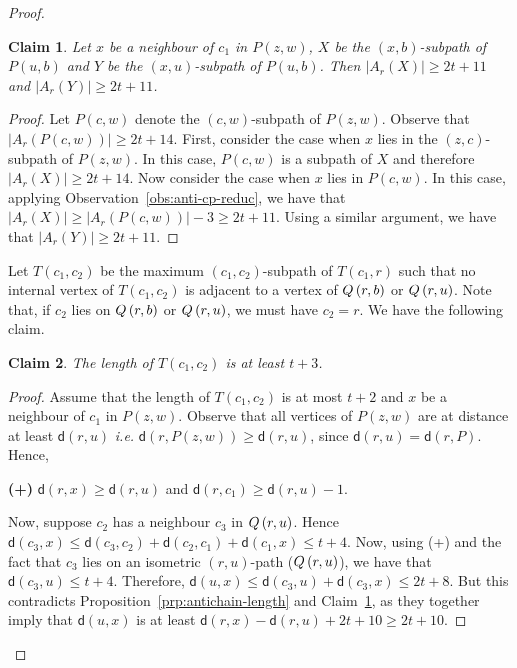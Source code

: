 \documentclass[a4paper]{article}
\newcommand{\dist}[2]{\mathsf{d}\left(#1,#2\right)}
\newcommand{\anticp}[2]{A_{#1}\left(#2\right)}
\newcommand{\Pnote}[2]{P\left(#1,#2\right)}
\newtheorem{claim}{Claim}[theorem]
\begin{document}
\begin{proof}
\begin{claim}\label{clm:life-saver}
Let $x$ be a neighbour of $c_1$ in $\Pnote{z}{w}$, $X$ be the $(x,b)$-subpath of $\Pnote{u}{b}$ and $Y$ be the $(x,u)$-subpath of $\Pnote{u}{b}$. Then $|\anticp{r}{X}| \geq 2t+11$ and $|\anticp{r}{Y}| \geq 2t+11$.
\end{claim}


 \begin{proof}
\sloppy  Let $\Pnote{c}{w}$ denote the %
 $(c,w)$-subpath of $\Pnote{z}{w}$. Observe that $|\anticp{r}{\Pnote{c}{w}}| \geq 2t+14$.
 First, consider the case when $x$ lies in the $(z,c)$-subpath of $\Pnote{z}{w}$. In this case, $\Pnote{c}{w}$ is a subpath of $X$ and therefore $|\anticp{r}{X}| \geq 2t+14$. Now consider the case when $x$ lies in $\Pnote{c}{w}$. In this case, applying Observation~\ref{obs:anti-cp-reduc}, we have that $|\anticp{r}{X}| \geq |\anticp{r}{\Pnote{c}{w}}| - 3 \geq 2t+11$. Using a similar argument, we have that $|\anticp{r}{Y}| \geq 2t+11$.
 \end{proof}

Let $T(c_1,c_2)$ be the maximum $(c_1,c_2)$-subpath of $T(c_1,r)$ such that no internal vertex of $T(c_1,c_2)$ is adjacent to a vertex of $Q\left({r},{b}\right)$ or $Q\left({r},{u}\right)$. {Note that, if $c_2$ lies on $Q\left({r},{b}\right)$ or $Q\left({r},{u}\right)$, we must have $c_2=r$}.  We have the following claim.

 \begin{claim}\label{clm:vacant-path}
 The length of $T(c_1,c_2)$ is at least $t+3$.
 \end{claim}

  \begin{proof}
 Assume that the length of $T(c_1,c_2)$ is at most $t+2$ and $x$ be a neighbour of $c_1$ in $\Pnote{z}{w}$. Observe that all vertices of $\Pnote{z}{w}$ are at distance at least $\dist{r}{u}$ \textit{i.e.} $\dist{r}{\Pnote{z}{w}} \geq \dist{r}{u}$, {since $\dist{r}{u}=\dist{r}{P}$}. Hence, 

 \medskip \textbf{(+)} $\dist{r}{x} \geq \dist{r}{u}$ and $\dist{r}{c_1} \geq \dist{r}{u} - 1$.

\noindent Now, suppose $c_2$ has a neighbour $c_3$ in $Q\left({r},{u}\right)$. Hence $\dist{c_3}{x} \leq \dist{c_3}{c_2} + \dist{c_2}{c_1} + \dist{c_1}{x} \leq t+4$. Now, using (+) and the fact that $c_3$ lies on an isometric $(r,u)$-path ($Q\left({r},{u}\right)$), we have that $\dist{c_3}{u} \leq t+4$. Therefore, $\dist{u}{x} \leq \dist{c_3}{u} + \dist{c_3}{x} \leq 2t+8$.  But this contradicts  Proposition~\ref{prp:antichain-length} and Claim~\ref{clm:life-saver}, as they together imply that $\dist{u}{x}$ is at least $\dist{r}{x} - \dist{r}{u} + 2t+10 {\geq 2t+10}$.



\end{proof}
\end{proof}
\end{document}
